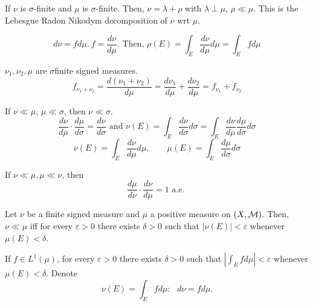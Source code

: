 \begin{rmk}[notation]
	If $\nu$ is $\sigma$-finite and $\mu$ is $\sigma$-finite. Then, 
	$\nu= \lambda + \rho$ with $\lambda \perp \mu$, $\rho \ll \mu$.
	This is the Lebesgue Radon Nikodym decomposition of $\nu$ wrt $\mu$.
\end{rmk}
\begin{dfn}
\[
d \nu = f d \mu. \ f = \frac{d \nu}{d \mu}. \text{  Then, } \rho(E)= \int_E  \frac{d \nu}{d \mu } d \mu = \int_E f d \mu
\]
\end{dfn}

\begin{dfn}
$\nu_1, \nu_2, \mu$ are $\sigma$finite signed measures.
\[
f_{\nu_1+\nu_2}= \frac{d(\nu_1 + \nu_2)}{d \mu}= \frac{d\nu_1}{d \mu}+\frac{d\nu_2}{d \mu}= f_{\nu_1}+ f_{\nu_2}
\]
\end{dfn}

\begin{thm}
If $\nu \ll \mu$, $\mu \ll \sigma$, then $\nu \ll \sigma$. \\
\[
\frac{d \nu}{d \mu} \cdot \frac{d \mu}{d \sigma} = \frac{d \nu}{d \sigma} \text{ and }  \nu(E) = \int_E \frac{d \nu}{d \sigma} d \sigma = \int_E \frac{d \nu}{d \mu} \frac{d \mu}{d \sigma}  d \sigma
\]	
\[
\nu(E) = \int_E \frac{d \nu}{d \mu} d \mu, \qquad \mu(E) = \int_E \frac{d \mu}{d \sigma} d \sigma 
\]
\end{thm}

\begin{rmk}
If $\nu \ll \mu, \mu \ll \nu$, then
\[
\frac{d \mu}{d \nu} \cdot \frac{d \nu}{d \mu}=1 \text{ a.e. }  
\]
\end{rmk}

\begin{thm}
Let $\nu$ be a finite signed measure and $\mu$ a positive measure on $(X, {\mathcal M})$. Then, $\nu \ll \mu$ iff for every $\varepsilon>0$ there exists $\delta>0$ such that $|\nu(E)|< \varepsilon$ whenever $\mu(E)< \delta$. 	
\end{thm}

\begin{cor}
If $f \in L^1(\mu)$, for every $\varepsilon>0$ there exists $\delta>0$ such that $|\int_E f d \mu| < \varepsilon$ whenever $\mu(E)< \delta$.	 Denote
\[
\nu(E) = \int_E f d \mu: \  \ \ d \nu = f d \mu.
\]
\end{cor}




